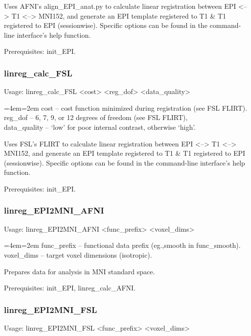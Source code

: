 \documentclass[final,titlepage,letterpaper,oneside,12pt]{article}
\renewcommand{\texttt}[2][BrickRed]{\textcolor{#1}{\ttfamily #2}}%
\newenvironment{blockquote}{%
  \par%
  \medskip
  \leftskip=4em\rightskip=2em%
  \noindent\ignorespaces}{%
  \par\medskip}
\begin{document}
\noindent Uses AFNI's align\_EPI\_anat.py to calculate linear registration between EPI <--> T1 <--> MNI152, and generate an EPI template registered to T1 \& T1 registered to EPI (sessionwise). Specific options can be found in the command-line interface's help function.

Prerequisites: \texttt{init\_EPI}.

\subsubsection{linreg\_calc\_FSL}
Usage: \texttt{linreg\_calc\_FSL <cost> <reg\_dof> <data\_quality>}

\begin{blockquote}
cost -- cost function minimized during registration (see FSL FLIRT). \\
reg\_dof -- 6, 7, 9, or 12 degrees of freedom (see FSL FLIRT), \\
data\_quality -- `low' for poor internal contrast, otherwise `high'. \
\end{blockquote}

\noindent Uses FSL's FLIRT to calculate linear registration between EPI <--> T1 <--> MNI152, and generate an EPI template registered to T1 \& T1 registered to EPI (sessionwise). Specific options can be found in the command-line interface's help function.

Prerequisites: \texttt{init\_EPI}.

\subsubsection{linreg\_EPI2MNI\_AFNI}
Usage: \texttt{linreg\_EPI2MNI\_AFNI <func\_prefix> <voxel\_dims>}

\begin{blockquote}
func\_prefix -- functional data prefix (eg.,smooth in func\_smooth). \\
voxel\_dims -- target voxel dimensions (isotropic). \
\end{blockquote}

\noindent Prepares data for analysis in MNI standard space.

Prerequisites: \texttt{init\_EPI}, \texttt{linreg\_calc\_AFNI}.

\subsubsection{linreg\_EPI2MNI\_FSL}
Usage: \texttt{linreg\_EPI2MNI\_FSL <func\_prefix> <voxel\_dims>}
\end{document}
